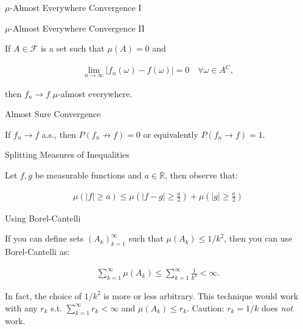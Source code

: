 \documentclass[10pt,landscape]{article}
\renewcommand{\leq}{\leqslant}
\renewcommand{\geq}{\geqslant}
\newcommand{\CalF}{\mathcal{F}}
\begin{document}
\begin{multicols}{3}
\begin{observation}{}{$\mu$-Almost Everywhere Convergence I}
\end{observation}

\begin{observation}{}{$\mu$-Almost Everywhere Convergence II}

    If $A \in \CalF$ is a set such that $\mu(A) = 0$ and

        \begin{align*}
            \lim_{n \to \infty} |f_n(\omega) - f(\omega)| = 0 \quad \forall \omega \in A^C,
        \end{align*}

    then $f_n \to f$ $\mu$-almost everywhere.

\end{observation}

\begin{observation}{}{Almost Sure Convergence}

    If $f_n \to f$ a.s., then $P(f_n \not\to f) = 0$ or equivalently $P(f_n \to f) = 1$.

\end{observation}

\begin{observation}{}{Splitting Measures of Inequalities}

    Let $f,g$ be measurable functions and $a \in \mathbb{R}$, then observe that:

        \begin{align*}
            \mu(|f| \geq a) \leq \mu\left( |f - g| \geq \frac{a}{2} \right) + \mu\left( |g| \geq \frac{a}{2} \right)
        \end{align*}

\end{observation}

\begin{observation}{}{Using Borel-Cantelli}

    If you can define sets $(A_k)_{k=1}^{\infty}$ such that $\mu(A_k) \leq 1/k^2$, then you can use Borel-Cantelli as:

        \begin{align*}
            \sum_{k=1}^{\infty} \mu(A_k) \leq \sum_{k=1}^{\infty} \frac{1}{k^2} < \infty.
        \end{align*}

    In fact, the choice of $1/k^2$ is more or less arbitrary. This technique would work with any $r_k$ s.t. $\sum_{k=1}^{\infty} r_k < \infty$ and $\mu(A_k) \leq r_k$. Caution: $r_k = 1/k$ does \emph{not} work.

\end{observation}


\end{multicols}
\end{document}
